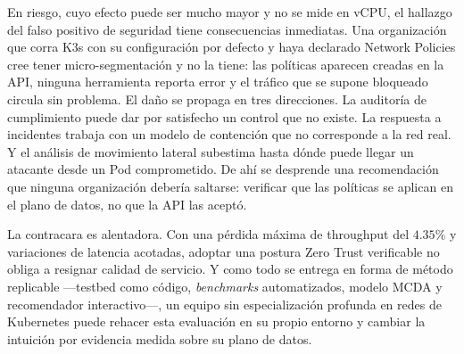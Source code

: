 En riesgo, cuyo efecto puede ser mucho mayor y no se mide en vCPU, el hallazgo del falso positivo de seguridad tiene consecuencias inmediatas. Una organización que corra K3s con su configuración por defecto y haya declarado Network Policies cree tener micro-segmentación y no la tiene: las políticas aparecen creadas en la API, ninguna herramienta reporta error y el tráfico que se supone bloqueado circula sin problema. El daño se propaga en tres direcciones. La auditoría de cumplimiento puede dar por satisfecho un control que no existe. La respuesta a incidentes trabaja con un modelo de contención que no corresponde a la red real. Y el análisis de movimiento lateral subestima hasta dónde puede llegar un atacante desde un Pod comprometido. De ahí se desprende una recomendación que ninguna organización debería saltarse: verificar que las políticas se aplican en el plano de datos, no que la API las aceptó.

La contracara es alentadora. Con una pérdida máxima de throughput del $4.35\%$ y variaciones de latencia acotadas, adoptar una postura Zero Trust verificable no obliga a resignar calidad de servicio. Y como todo se entrega en forma de método replicable ---testbed como código, \emph{benchmarks} automatizados, modelo MCDA y recomendador interactivo---, un equipo sin especialización profunda en redes de Kubernetes puede rehacer esta evaluación en su propio entorno y cambiar la intuición por evidencia medida sobre su plano de datos.
